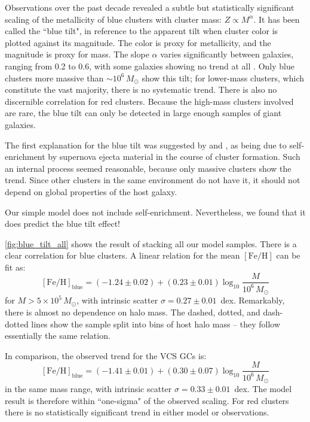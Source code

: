 \documentclass[fleqn,usenatbib]{mnras}
\newcommand{\Msun}{\,M_{\odot}}
\newcommand{\feh}{\mathrm{[Fe/H]}}
\begin{document}
Observations over the past decade revealed a subtle but statistically significant scaling of the metallicity of blue clusters with cluster mass: $Z \propto M^{\alpha}$. It has been called the ``blue tilt", in reference to the apparent tilt when cluster color is plotted against its magnitude. The color is proxy for metallicity, and the magnitude is proxy for mass. The slope $\alpha$ varies significantly between galaxies, ranging from 0.2 to 0.6, with some galaxies showing no trend at all \citep[][]{harris_etal06,  strader_etal06,  spitler2006, schiavon_etal_2013, fensch_etal_2014,harris_etal17_bcg3}. Only blue clusters more massive than $\sim 10^6\Msun$ show this tilt; for lower-mass clusters, which constitute the vast majority, there is no systematic trend. There is also no discernible correlation for red clusters. Because the high-mass clusters involved are rare, the blue tilt can only be detected in large enough samples of giant galaxies.

The first explanation for the blue tilt was suggested by \citet{strader_smith_2008} and \citet{bailin_harris09}, as being due to self-enrichment by supernova ejecta material in the course of cluster formation. Such an internal process seemed reasonable, because only massive clusters show the trend. Since other clusters in the same environment do not have it, it should not depend on global properties of the host galaxy. 

Our simple model does not include self-enrichment. Nevertheless, we found that it does predict the blue tilt effect!

\autoref{fig:blue_tilt_all} shows the result of stacking all our model samples. There is a clear correlation for blue clusters. A linear relation for the mean $\feh$ can be fit as:
\begin{equation}
  \feh_{\mathrm{blue}} = (-1.24 \pm 0.02) + (0.23 \pm 0.01)\log_{10}\frac{M}{10^6\Msun}
\end{equation}
for $M > 5\times 10^{5}\Msun$, with intrinsic scatter $\sigma = 0.27\pm 0.01$~dex. Remarkably, there is almost no dependence on halo mass. The dashed, dotted, and dash-dotted lines show the sample split into bins of host halo mass -- they follow essentially the same relation. 

In comparison, the observed trend for the VCS GCs is:
\begin{equation}
   \feh_{\mathrm{blue}} = (-1.41 \pm 0.01) + (0.30 \pm 0.07)\log_{10}\frac{M}{10^6\Msun}
\end{equation} 
in the same mass range, with intrinsic scatter $\sigma = 0.33\pm 0.01$~dex. The model result is therefore within ``one-sigma" of the observed scaling. For red clusters there is no statistically significant trend in either model or observations.
\end{document}
